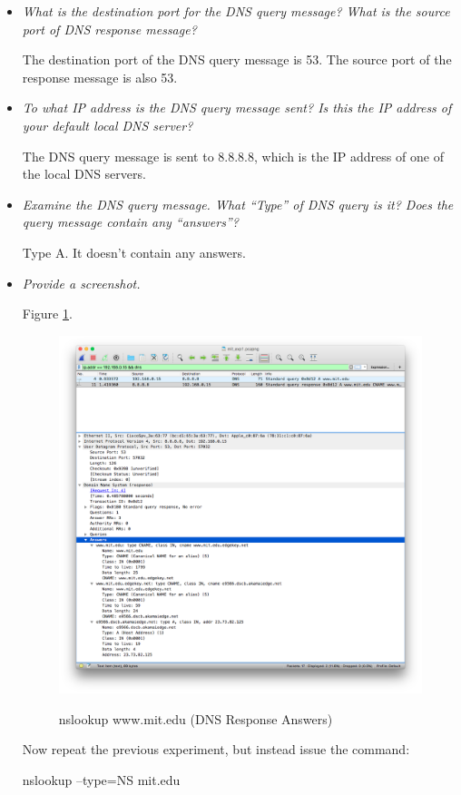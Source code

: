 \documentclass[11pt]{article}
\begin{document}
\begin{itemize}
	\item
		\textit{What is the destination port for the DNS query message? What is the source port of DNS response message?}
		\par The destination port of the DNS query message is 53. The source port of the response message is also 53.
		
	\item
		\textit{To what IP address is the DNS query message sent? Is this the IP address of your default local DNS server?}
		\par The DNS query message is sent to 8.8.8.8, which is the IP address of one of the local DNS servers.
		
	\item
		\textit{Examine the DNS query message. What “Type” of DNS query is it? Does the query message contain any “answers”?}
		\par Type A. It doesn't contain any answers.
		
	\item
		\textit{Provide a screenshot.}
		\par Figure \ref{fig:11}.
		
		\begin{figure}[H]
		\centering
		\caption{nslookup www.mit.edu (DNS Response Answers)}
		\includegraphics[width=400px]{11}
		\label{fig:11}
		\end{figure}
		
\pagebreak

\par Now repeat the previous experiment, but instead issue the command:
\par nslookup –type=NS mit.edu


\end{itemize}
\end{document}
